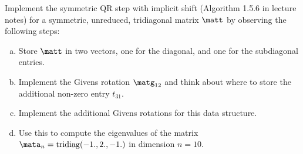 \begin{Sheet}
  \begin{Problem}[Programming]
    Implement the symmetric QR step with implicit shift (Algorithm
    1.5.6 in lecture notes) for a symmetric, unreduced, tridiagonal
    matrix $\matt$ by observing the following steps:
    \begin{enumerate}[(a)]
    \item Store $\matt$ in two vectors, one for the diagonal, and one
      for the subdiagonal entries.
    \item Implement the Givens rotation $\matg_{12}$ and think about
      where to store the additional non-zero entry $t_{31}$.
    \item Implement the additional Givens rotations for this data
      structure.
    \item Use this to compute the eigenvalues of the matrix
      $\mata_n=\operatorname{tridiag}(-1.,2.,-1.)$ in dimension
      $n=10$.
    \end{enumerate}
  \end{Problem}

\end{Sheet}


